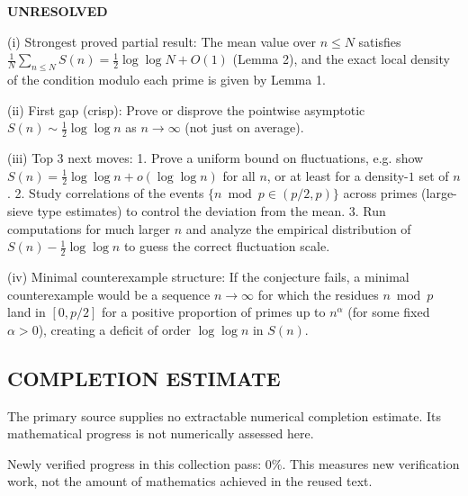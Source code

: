 \textbf{UNRESOLVED}

(i) Strongest proved partial result: The mean value over $n\le N$ satisfies $\frac{1}{N}\sum_{n\le N}S(n)=\frac12\log\log N+O(1)$ (Lemma 2), and the exact local density of the condition modulo each prime is given by Lemma 1.

(ii) First gap (crisp): Prove or disprove the pointwise asymptotic $S(n)\sim \tfrac12\log\log n$ as $n\to\infty$ (not just on average).

(iii) Top 3 next moves:
  1. Prove a uniform bound on fluctuations, e.g. show $S(n)=\tfrac12\log\log n + o(\log\log n)$ for all $n$, or at least for a density-$1$ set of $n$.
  2. Study correlations of the events $\{n\bmod p\in(p/2,p)\}$ across primes (large-sieve type estimates) to control the deviation from the mean.
  3. Run computations for much larger $n$ and analyze the empirical distribution of $S(n)-\tfrac12\log\log n$ to guess the correct fluctuation scale.

(iv) Minimal counterexample structure: If the conjecture fails, a minimal counterexample would be a sequence $n\to\infty$ for which the residues $n\bmod p$ land in $[0,p/2]$ for a positive proportion of primes up to $n^\alpha$ (for some fixed $\alpha>0$), creating a deficit of order $\log\log n$ in $S(n)$.




\subsection*{COMPLETION ESTIMATE}
The primary source supplies no extractable numerical completion estimate. Its mathematical progress is not numerically assessed here.

Newly verified progress in this collection pass: $0\%$. This measures new verification work, not the amount of mathematics achieved in the reused text.
